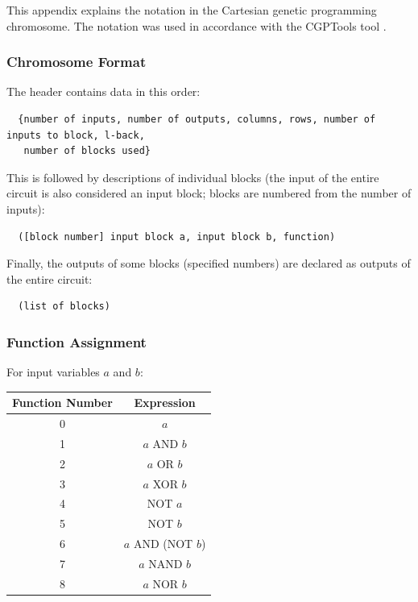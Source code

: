 %
%
%
%
%
%
This appendix explains the notation in the Cartesian genetic programming chromosome.
The notation was used in accordance with the CGPTools tool \cite{vasicek}.
\subsubsection{Chromosome Format}
The header contains data in this order:
\begin{verbatim}
  {number of inputs, number of outputs, columns, rows, number of inputs to block, l-back,
   number of blocks used}
\end{verbatim}
This is followed by descriptions of individual blocks (the input of the entire circuit is also considered an input block; blocks
are numbered from the number of inputs):
\begin{verbatim}
  ([block number] input block a, input block b, function)
\end{verbatim}
Finally, the outputs of some blocks (specified numbers) are declared as outputs of the entire circuit:
\begin{verbatim}
  (list of blocks)
\end{verbatim}


\subsubsection{Function Assignment}
For input variables $a$ and $b$:

\begin{center}
     \begin{tabular}{| c | c |}
      \hline
      Function Number & Expression \\ \hline\hline
      0 & $a$ \\ \hline
      1 & $a$ AND $b$ \\ \hline
      2 & $a$ OR $b$ \\ \hline
      3 & $a$ XOR $b$ \\ \hline
      4 & NOT $a$ \\ \hline
      5 & NOT $b$ \\ \hline
      6 & $a$ AND (NOT $b$) \\ \hline
      7 & $a$ NAND $b$ \\ \hline
      8 & $a$ NOR $b$ \\ \hline
     \end{tabular}
\end{center}
